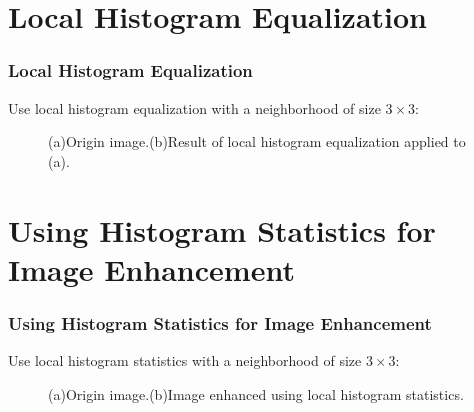 \documentclass[notheorems,serif,table,compress]{beamer}  %
\begin{document}
\section{Local Histogram Equalization}
\begin{frame}
\frametitle{Local Histogram Equalization}
Use local histogram equalization with a neighborhood of size $3\times3$:
\begin{figure}
\begin{center}
\end{center}
\caption{(a)Origin image.(b)Result of local histogram equalization applied to (a).}
\end{figure}
\end{frame}

\section{Using Histogram Statistics for Image Enhancement}
\begin{frame}
\frametitle{Using Histogram Statistics for Image Enhancement}
Use local histogram statistics with a neighborhood of size $3\times3$:
\begin{figure}
\begin{center}
\end{center}
\caption{(a)Origin image.(b)Image enhanced using local histogram statistics.}
\end{figure}
\end{frame}
\end{document}
